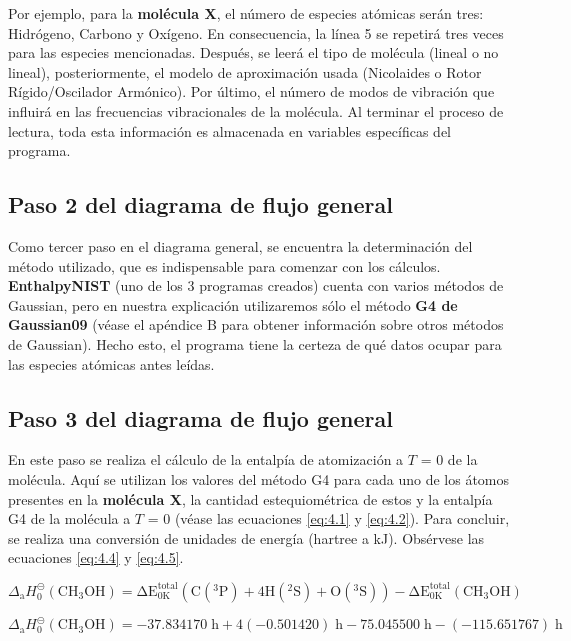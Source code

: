 Por ejemplo, para la \textbf{molécula X}, el número de especies atómicas serán tres: Hidrógeno, Carbono y Oxígeno. En consecuencia, la línea 5 se repetirá tres veces para las especies mencionadas. Después, se leerá el tipo de molécula (lineal o no lineal), posteriormente, el modelo de aproximación usada (Nicolaides o Rotor Rígido/Oscilador Armónico). Por último, el número de modos de vibración que influirá en las frecuencias vibracionales de la molécula. Al terminar el proceso de lectura, toda esta información es almacenada en variables específicas del programa. 

 
\subsection{Paso 2 del diagrama de flujo general}

Como tercer paso en el diagrama general, se encuentra la determinación del método utilizado, que es indispensable para comenzar con los cálculos. \textbf{EnthalpyNIST} (uno de los 3 programas creados) cuenta con varios métodos de Gaussian, pero en nuestra explicación utilizaremos sólo el método \textbf{G4 de Gaussian09} (véase el apéndice B para obtener información sobre otros métodos de Gaussian). Hecho esto, el programa tiene la certeza de qué datos ocupar para las especies atómicas antes leídas.



\subsection{Paso 3 del diagrama de flujo general}

En este paso se realiza el cálculo de la entalpía de atomización a $T$ = 0 de la molécula. Aquí se utilizan los valores del método G4 para cada uno de los átomos presentes en la \textbf{molécula X}, la cantidad estequiométrica de estos y la entalpía G4 de la molécula a $T$ = 0 (véase las ecuaciones \ref{eq:4.1} y \ref{eq:4.2}). Para concluir, se realiza una conversión de unidades de energía (hartree a kJ). Obsérvese las ecuaciones \ref{eq:4.4} y \ref{eq:4.5}.

\begin{equation}
	\Delta_\mathrm{{a}} H^{\circleddash}_{\mathrm{0}}\mathrm{(CH_3OH) = \Delta E^\mathrm{{total}}_{0K} (C(^{3}P) + 4H(^{2}S) + O(^{3}S))- \Delta E^\mathrm{{total}}_{0K} (CH_{3}OH)}
\label{eq:4.1}
\end{equation}

\begin{equation}
	\Delta_\mathrm{{a}} H^{\circleddash}_{0}\mathrm{(CH_3OH) = -37.834170\;\mathrm{h} + 4(-0.501420)\;\mathrm{h} - 75.045500\;\mathrm{h} -(-115.651767)\;\mathrm{h}}
\label{eq:4.2}
\end{equation}

